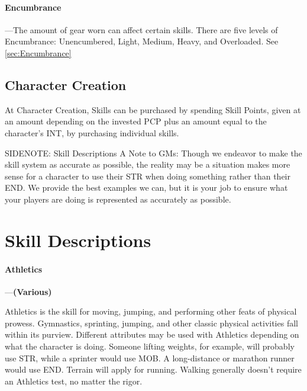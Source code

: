 \documentclass[oneside,11pt,english]{book}
\begin{document}
\paragraph{Encumbrance}
---\quad The amount of gear worn can affect certain skills. There are five levels of Encumbrance: Unencumbered, Light, Medium, Heavy, and Overloaded. See \autoref{sec:Encumbrance}

\subsection{Character Creation}
At Character Creation, Skills can be purchased by spending Skill Points, given at an amount depending on the invested PCP plus an amount equal to the character’s INT, by purchasing individual skills.

SIDENOTE: Skill Descriptions %
A Note to GMs: Though we endeavor to make the skill system as accurate as possible, the reality may be 
a situation makes more sense for a character to use their STR when doing something rather than their 
END. We provide the best examples we can, but it is your job to ensure what your players are doing is 
represented as accurately as possible. 

\section{Skill Descriptions}
\paragraph{\label{skill:Athletics}Athletics}---\quad\textbf{(Various)}\par%
Athletics is the skill for moving, jumping, and performing other feats of physical prowess. Gymnastics, sprinting, jumping, and other classic physical activities fall within its purview. Different attributes may be used with Athletics depending on what the character is doing. Someone lifting weights, for example, will probably use STR, while a sprinter would use MOB. A long-distance or marathon runner would use END. Terrain will apply for running. Walking generally doesn’t require an Athletics test, no matter the rigor.
\end{document}
